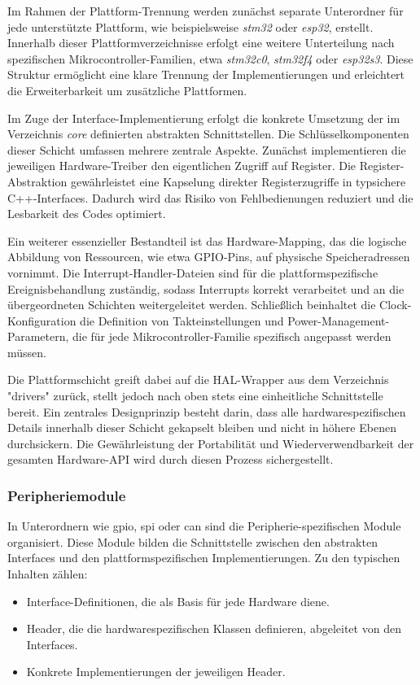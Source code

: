 Im Rahmen der Plattform-Trennung werden zunächst separate Unterordner für jede unterstützte Plattform, wie beispielsweise \textit{stm32} oder \textit{esp32}, erstellt. 
Innerhalb dieser Plattformverzeichnisse erfolgt eine weitere Unterteilung nach spezifischen Mikrocontroller-Familien, etwa \textit{stm32c0}, \textit{stm32f4} oder \textit{esp32s3}. 
Diese Struktur ermöglicht eine klare Trennung der Implementierungen und erleichtert die Erweiterbarkeit um zusätzliche Plattformen.

Im Zuge der Interface-Implementierung erfolgt die konkrete Umsetzung der im Verzeichnis \textit{core} definierten abstrakten Schnittstellen. 
Die Schlüsselkomponenten dieser Schicht umfassen mehrere zentrale Aspekte. 
Zunächst implementieren die jeweiligen Hardware-Treiber den eigentlichen Zugriff auf Register.
Die Register-Abstraktion gewährleistet eine Kapselung direkter Registerzugriffe in typsichere C++-Interfaces. 
Dadurch wird das Risiko von Fehlbedienungen reduziert und die Lesbarkeit des Codes optimiert.

Ein weiterer essenzieller Bestandteil ist das Hardware-Mapping, das die logische Abbildung von Ressourcen, wie etwa GPIO-Pins, auf physische Speicheradressen vornimmt. 
Die Interrupt-Handler-Dateien sind für die plattformspezifische Ereignisbehandlung zuständig, sodass Interrupts korrekt verarbeitet und an die übergeordneten Schichten weitergeleitet werden. 
Schließlich beinhaltet die Clock-Konfiguration die Definition von Takteinstellungen und Power-Management-Parametern, die für jede Mikrocontroller-Familie spezifisch angepasst werden müssen.

Die Plattformschicht greift dabei auf die HAL-Wrapper aus dem Verzeichnis "drivers" zurück, stellt jedoch nach oben stets eine einheitliche Schnittstelle bereit. 
Ein zentrales Designprinzip besteht darin, dass alle hardwarespezifischen Details innerhalb dieser Schicht gekapselt bleiben und nicht in höhere Ebenen durchsickern. 
Die Gewährleistung der Portabilität und Wiederverwendbarkeit der gesamten Hardware-API wird durch diesen Prozess sichergestellt.

\subsubsection*{Peripheriemodule}
In Unterordnern wie gpio, spi oder can sind die Peripherie-spezifischen Module organisiert. 
Diese Module bilden die Schnittstelle zwischen den abstrakten Interfaces und den plattformspezifischen Implementierungen.
Zu den typischen Inhalten zählen:
\begin{itemize}
	\item Interface-Definitionen, die als Basis für jede Hardware diene.
	\item Header, die die hardwarespezifischen Klassen definieren, abgeleitet von den Interfaces.
	\item Konkrete Implementierungen der jeweiligen Header.
\end{itemize}

